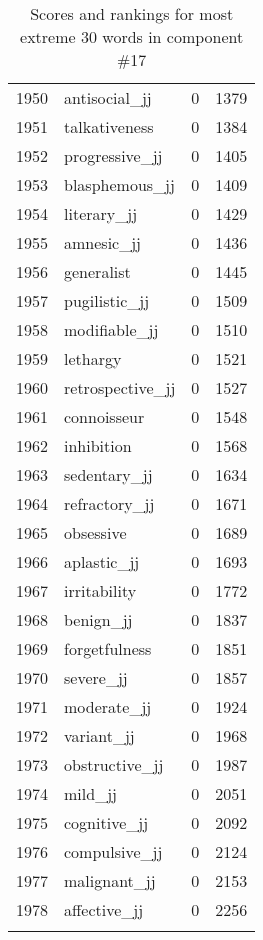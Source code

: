 \begin{longtable}[!htbp]{| rlr@{.}l |}
    1950 & antisocial\_jj & 0 & 1379 \\
    1951 & talkativeness & 0 & 1384 \\
    1952 & progressive\_jj & 0 & 1405 \\
    1953 & blasphemous\_jj & 0 & 1409 \\
    1954 & literary\_jj & 0 & 1429 \\
    1955 & amnesic\_jj & 0 & 1436 \\
    1956 & generalist & 0 & 1445 \\
    1957 & pugilistic\_jj & 0 & 1509 \\
    1958 & modifiable\_jj & 0 & 1510 \\
    1959 & lethargy & 0 & 1521 \\
    1960 & retrospective\_jj & 0 & 1527 \\
    1961 & connoisseur & 0 & 1548 \\
    1962 & inhibition & 0 & 1568 \\
    1963 & sedentary\_jj & 0 & 1634 \\
    1964 & refractory\_jj & 0 & 1671 \\
    1965 & obsessive & 0 & 1689 \\
    1966 & aplastic\_jj & 0 & 1693 \\
    1967 & irritability & 0 & 1772 \\
    1968 & benign\_jj & 0 & 1837 \\
    1969 & forgetfulness & 0 & 1851 \\
    1970 & severe\_jj & 0 & 1857 \\
    1971 & moderate\_jj & 0 & 1924 \\
    1972 & variant\_jj & 0 & 1968 \\
    1973 & obstructive\_jj & 0 & 1987 \\
    1974 & mild\_jj & 0 & 2051 \\
    1975 & cognitive\_jj & 0 & 2092 \\
    1976 & compulsive\_jj & 0 & 2124 \\
    1977 & malignant\_jj & 0 & 2153 \\
    1978 & affective\_jj & 0 & 2256 \\
    \hline
    \caption{Scores and rankings for most extreme 30 words in component \#17} \\
\end{longtable}
